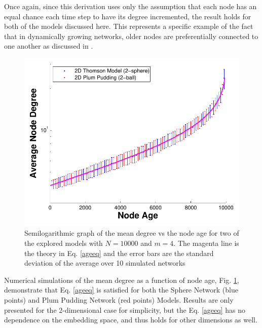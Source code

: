 \documentclass[aps,pre,reprint,superscriptaddress,amsmath,amssymb,nofootinbib]{revtex4-1}
\begin{document}
Once again, since this derivation uses only the assumption that each node has an equal chance each time step to have its degree incremented, the result holds for both of the models discussed here.
This represents a specific example of the fact that in dynamically growing networks, older nodes are preferentially connected to one another as discussed in \cite{reallyrandom}.
\begin{figure}
\includegraphics[width=\linewidth]{figures/figDvsAge.pdf}
\caption{\label{degage}Semilogarithmic graph of the mean degree vs the node age for two of the explored models with $N = 10000$ and $m = 4$. The magenta line is the theory in Eq. \eqref{ageeq} and the error bars are the standard deviation of the average over 10 simulated networks}
\end{figure}
Numerical simulations of the mean degree as a function of node age, Fig. \ref{degage}, demonstrate that Eq. \eqref{ageeq} is satisfied for both the Sphere Network (blue points) and Plum Pudding Network (red points) Models.
Results are only presented for the $2$-dimensional case for simplicity, but the Eq. \eqref{ageeq} has no dependence on the embedding space, and thus holds for other dimensions as well.
\end{document}
